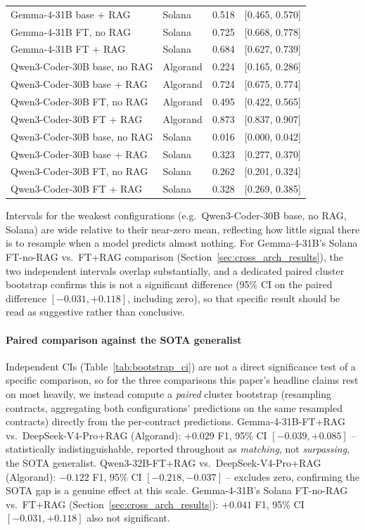 \documentclass[lettersize,journal]{IEEEtran}
\begin{document}
\begin{table}[t]
{\begin{tabular}{llcc}
Gemma-4-31B base + RAG & Solana & 0.518 & [0.465, 0.570] \\
Gemma-4-31B FT, no RAG & Solana & 0.725 & [0.668, 0.778] \\
Gemma-4-31B FT + RAG & Solana & 0.684 & [0.627, 0.739] \\
\midrule
Qwen3-Coder-30B base, no RAG & Algorand & 0.224 & [0.165, 0.286] \\
Qwen3-Coder-30B base + RAG & Algorand & 0.724 & [0.675, 0.774] \\
Qwen3-Coder-30B FT, no RAG & Algorand & 0.495 & [0.422, 0.565] \\
Qwen3-Coder-30B FT + RAG & Algorand & 0.873 & [0.837, 0.907] \\
Qwen3-Coder-30B base, no RAG & Solana & 0.016 & [0.000, 0.042] \\
Qwen3-Coder-30B base + RAG & Solana & 0.323 & [0.277, 0.370] \\
Qwen3-Coder-30B FT, no RAG & Solana & 0.262 & [0.201, 0.324] \\
Qwen3-Coder-30B FT + RAG & Solana & 0.328 & [0.269, 0.385] \\
\bottomrule
\end{tabular}%
}
\end{table}

Intervals for the weakest configurations (e.g.\ Qwen3-Coder-30B base, no RAG,
Solana) are wide relative to their near-zero mean, reflecting how little signal there is to resample
when a model predicts almost nothing. For Gemma-4-31B's Solana FT-no-RAG vs.\ FT+RAG comparison
(Section~\ref{sec:cross_arch_results}), the two independent intervals overlap substantially, and a
dedicated paired cluster bootstrap confirms this is not a significant difference (95\% CI on the
paired difference $[-0.031, +0.118]$, including zero), so that specific result should be read as
suggestive rather than conclusive.

\paragraph{Paired comparison against the SOTA generalist}
\label{sec:paired_bootstrap}
Independent CIs (Table~\ref{tab:bootstrap_ci}) are not a direct significance test of a specific
comparison, so for the three comparisons this paper's headline claims rest on most heavily, we
instead compute a \emph{paired} cluster bootstrap (resampling contracts, aggregating both
configurations' predictions on the same resampled contracts) directly from the per-contract
predictions. Gemma-4-31B-FT+RAG vs.\ DeepSeek-V4-Pro+RAG (Algorand): $+0.029$ F1, 95\% CI
$[-0.039, +0.085]$ -- statistically indistinguishable, reported throughout as \emph{matching}, not
\emph{surpassing}, the SOTA generalist.
Qwen3-32B-FT+RAG vs.\ DeepSeek-V4-Pro+RAG
(Algorand): $-0.122$ F1, 95\% CI $[-0.218, -0.037]$ -- excludes zero, confirming the SOTA gap is a
genuine effect at this scale. Gemma-4-31B's Solana FT-no-RAG vs.\ FT+RAG
(Section~\ref{sec:cross_arch_results}): $+0.041$ F1, 95\% CI $[-0.031, +0.118]$ also not
significant.
\end{document}
